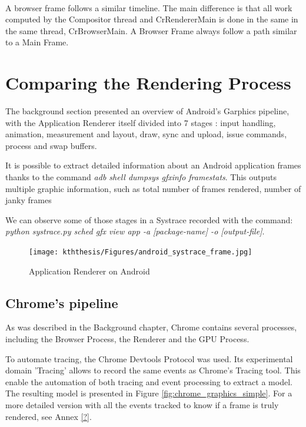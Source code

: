 \paragraph{}
A browser frame follows a similar timeline. The main difference is that all work computed by the Compositor thread and CrRendererMain is done in the same in the same thread, CrBrowserMain. A Browser Frame always follow a path similar to a Main Frame.

\section{Comparing the Rendering Process}
   
    The background section presented an overview of Android's Garphics pipeline, with the Application Renderer itself divided into 7 stages : input handling, animation, measurement and layout, draw, sync and upload, issue commands, process and swap buffers. 
    
    It is possible to extract detailed information about an Android application frames thanks to the command \textit{adb shell dumpsys gfxinfo framestats}. This outputs multiple graphic information, such as total number of frames rendered, number of janky frames
    
    We can observe some of those stages in a Systrace recorded with the command: \textit{python systrace.py sched gfx view app -a [package-name] -o [output-file]}.
    
    \begin{figure}[!ht]
        \texttt{[image: kththesis/Figures/android\_systrace\_frame.jpg]}
        \caption{Application Renderer on Android}
        \label{fig:android_systrace}
    \end{figure}
    
    
    \subsection{Chrome's pipeline}
       As was described in the Background chapter, Chrome contains several processes, including the Browser Process, the Renderer and the GPU Process.
       
       To automate tracing, the Chrome Devtools Protocol was used. Its experimental domain 'Tracing' allows to record the same events as Chrome's Tracing tool. This enable the automation of both tracing and event processing to extract a model. \newline
The resulting model is presented in Figure \ref{fig:chrome_graphics_simple}. For a more detailed version with all the events tracked to know if a frame is truly rendered, see Annex \ref{?}.

